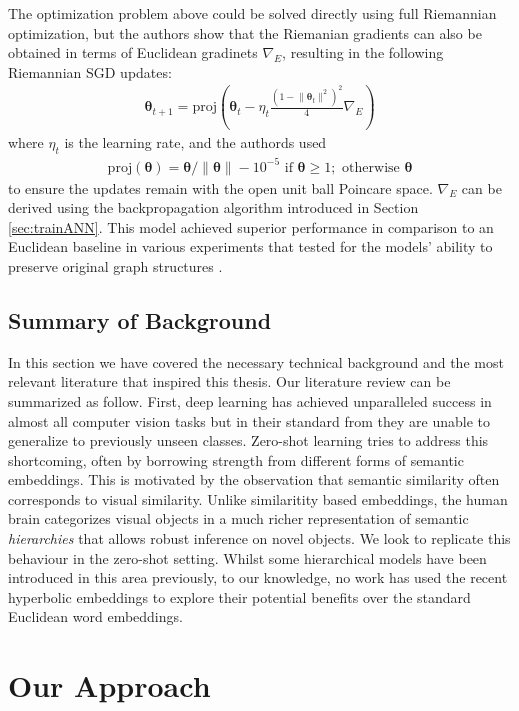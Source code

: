 \documentclass[12pt]{report}
\begin{document}
The optimization problem above could be solved directly using full Riemannian optimization, but the authors show that the Riemanian gradients can also be obtained in terms of Euclidean gradinets $\nabla_E$, resulting in the following Riemannian SGD updates:  
\begin{align*}
  \boldsymbol{\theta}_{t+1} = \text{proj} \left( \boldsymbol{\theta}_t -\eta_t \frac{(1-\lVert\boldsymbol{\theta}_t\rVert^2)^2}{4}\nabla_E \right)
\end{align*}
where $\eta_t$ is the learning rate, and the authords used
\begin{align}
\text{proj}(\boldsymbol{\theta}) = \boldsymbol{\theta}/\lVert \boldsymbol{\theta} \rVert - 10^{-5}\text{ if }\boldsymbol{\theta} \geq 1; \text{ otherwise } \boldsymbol{\theta}
\end{align}
to ensure the updates remain with the open unit ball Poincare space. $\nabla_E$ can be derived using the backpropagation algorithm introduced in Section \ref{sec:trainANN}. This model achieved superior performance in comparison to an Euclidean baseline in various experiments that tested for the models' ability to preserve original graph structures \cite{Nickel2017}.

\section{Summary of Background}
In this section we have covered the necessary technical background and the most relevant literature that inspired this thesis. Our literature review can be summarized as follow. First, deep learning has achieved unparalleled success in almost all computer vision tasks but in their standard from they are unable to generalize to previously unseen classes. Zero-shot learning tries to address this shortcoming, often by borrowing strength from different forms of semantic embeddings. This is motivated by the observation that semantic similarity often corresponds to visual similarity. Unlike similaritity based embeddings, the human brain categorizes visual objects in a much richer representation of semantic \textit{hierarchies} that allows robust inference on novel objects. We look to replicate this behaviour in the zero-shot setting. Whilst some hierarchical models have been introduced in this area previously, to our knowledge, no work has used the recent hyperbolic embeddings to explore their potential benefits over the standard Euclidean word embeddings.

\chapter{Our Approach}
\end{document}
